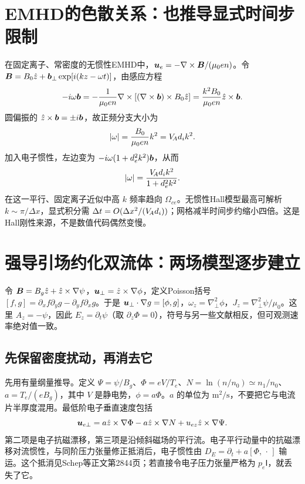 \section{EMHD的色散关系：也推导显式时间步限制}
在固定离子、常密度的无惯性EMHD中，$\bm{u}_e=-\nabla\times\bm{B}/(\mu_0en)$。令 $\bm{B}=B_0\hat z+\bm{b}_\perp\exp[i(kz-\omega t)]$，由感应方程
\begin{equation}-i\omega\bm{b}=-{1\over\mu_0en}\nabla\times[(\nabla\times\bm{b})\times B_0\hat z]
={k^2B_0\over\mu_0en}\hat z\times\bm{b}.
\end{equation}
圆偏振的 $\hat z\times\bm{b}=\pm i\bm{b}$，故正频分支大小为
\begin{equation}|\omega|={B_0\over\mu_0en}k^2=V_{\!A} d_i k^2.\label{eq:whistler}\end{equation}
加入电子惯性，左边变为 $-i\omega(1+d_e^2k^2)\bm{b}$，从而
\begin{equation}|\omega|={V_{\!A} d_i k^2\over1+d_e^2k^2}.
\end{equation}
在这一平行、固定离子近似中高 $k$ 频率趋向 $\Omega_{ce}$。无惯性Hall模型最高可解析 $k\sim\pi/\Delta x$，显式积分需 $\Delta t=O(\Delta x^2/(V_{\!A} d_i))$；网格减半时间步约缩小四倍。这是Hall刚性来源，不是数值代码偶然变慢。



\section{强导引场约化双流体：两场模型逐步建立}
令 $\bm{B}=B_g\hat z+\hat z\times\nabla\psi$，$\bm{u}_\perp=\hat z\times\nabla\phi$，定义Poisson括号
$[f,g]=\partial_xf\partial_yg-\partial_yf\partial_xg$。于是 $\bm{u}_\perp\cdot\nabla g=[\phi,g]$，$\omega_z=\nabla_\perp^2\phi$，$J_z=\nabla_\perp^2\psi/\mu_0$。这里 $A_z=-\psi$，因此 $E_z=\partial_t\psi$（取 $\partial_z\Phi=0$），符号与另一些文献相反，但可观测速率绝对值一致。

\subsection{先保留密度扰动，再消去它}
先用有量纲量推导。定义 $\Psi=\psi/B_g$、$\Phi=eV/T_e$、$N=\ln(n/n_0)\simeq n_1/n_0$、$a=T_e/(eB_g)$，其中 $V$ 是静电势，$\phi=a\Phi$。$a$ 的单位为 $\mathrm{m^2/s}$，不要把它与电流片半厚度混用。最低阶电子垂直速度包括
\begin{equation}
\bm{u}_{e\perp}=a\hat z\times\nabla\Phi-a\hat z\times\nabla N+u_{ez}\hat z\times\nabla\Psi.
\end{equation}
第二项是电子抗磁漂移，第三项是沿倾斜磁场的平行流。电子平行动量中的抗磁漂移对流惯性，与同阶压力张量修正抵消后，电子惯性由 $D_E=\partial_t+a[\Phi,\,\cdot\,]$ 输运。这个抵消见Schep等正文第2844页；若直接令电子压力张量严格为 $p_e\mathsf I$，就丢失了它。

